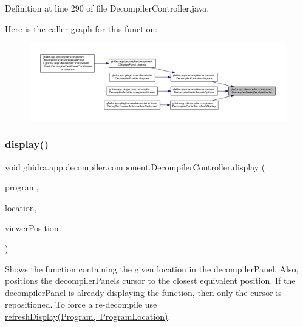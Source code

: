 Definition at line 290 of file Decompiler\+Controller.\+java.

Here is the caller graph for this function\+:
\nopagebreak
\begin{figure}[H]
\begin{center}
\leavevmode
\includegraphics[width=350pt]{classghidra_1_1app_1_1decompiler_1_1component_1_1_decompiler_controller_a25f18cefdf4ffabb3de1970ebcc110b9_icgraph}
\end{center}
\end{figure}
\mbox{\label{classghidra_1_1app_1_1decompiler_1_1component_1_1_decompiler_controller_a1fe6c6e0f0652b4ae240ec90a9214612}} 
\subsubsection{\texorpdfstring{display()}{display()}}
{\footnotesize\ttfamily void ghidra.\+app.\+decompiler.\+component.\+Decompiler\+Controller.\+display (\begin{DoxyParamCaption}\item[{Program}]{program,  }\item[{Program\+Location}]{location,  }\item[{Viewer\+Position}]{viewer\+Position }\end{DoxyParamCaption})\hspace{0.3cm}{\ttfamily [inline]}}

Shows the function containing the given location in the decompiler\+Panel. Also, positions the decompiler\+Panel\textquotesingle{}s cursor to the closest equivalent position. If the decompiler\+Panel is already displaying the function, then only the cursor is repositioned. To force a re-\/decompile use \mbox{\hyperlink{}{refresh\+Display(\+Program, Program\+Location)}}.


